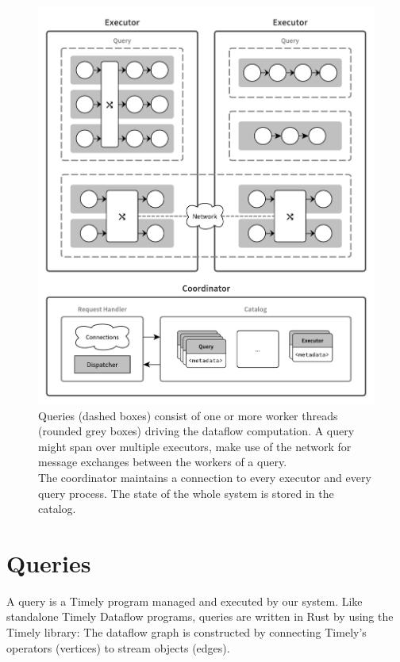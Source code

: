 \begin{figure}[htb]
  \centering
    \includegraphics[width=1\textwidth]{figures/components}
  \caption[System architecture.]{ Queries (dashed boxes) consist of one or
  more worker threads (rounded grey boxes) driving the dataflow computation.
  A query might span over multiple executors, make use of the network for message exchanges
  between the workers of a query.\\
  The coordinator maintains a connection to every  executor and every query process.
  The state of the whole system is stored in the catalog.}
  \label{fig:components}
\end{figure}

\clearpage

\section{Queries}

A query is a Timely program managed and executed by our system. Like
standalone Timely Dataflow programs, queries are written in Rust by using the
Timely library: The dataflow graph is constructed by connecting
Timely's operators (vertices) to stream objects (edges).

